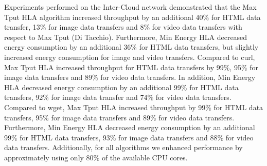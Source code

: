 \documentclass[conference]{IEEEtran}
\begin{document}
Experiments performed on the Inter-Cloud network demonstrated that the Max Tput HLA algorithm increased throughput by an additional 40\% for HTML data transfer, 13\% for image data transfers and 8\% for video data transfers with respect to Max Tput (Di Tacchio). Furthermore, Min Energy HLA decreased energy consumption by an additional 36\% for HTML data transfers, but slightly increased energy consumption for image and video transfers. Compared to curl, Max Tput HLA increased throughput for HTML data transfers by  99\%, 95\% for image data transfers and 89\% for video data transfers. In addition, Min Energy HLA decreased energy consumption by an additional 99\% for HTML data transfers, 92\% for image data transfer and 74\% for video data transfers. Compared to wget, Max Tput HLA increased throughput by 99\% for HTML data transfers, 95\% for image data transfers and  89\% for video data transfers. Furthermore, Min Energy HLA  decreased energy consumption by an additional 99\% for HTML data transfers, 93\% for image data transfers and 88\% for video data transfers. Additionally, for all algorithms we enhanced performance by approximately using only 80\% of the available CPU cores. 



\end{document}
